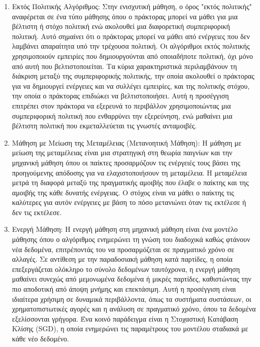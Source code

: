 \begin{enumerate}
    \item Εκτός Πολιτικής Αλγόριθμος: Στην ενισχυτική μάθηση, ο όρος "εκτός πολιτικής" αναφέρεται σε ένα τύπο μάθησης όπου ο πράκτορας μπορεί να μάθει για μια βέλτιστη ή στόχο πολιτική ενώ ακολουθεί μια διαφορετική συμπεριφορική πολιτική. Αυτό σημαίνει ότι ο πράκτορας μπορεί να μάθει από ενέργειες που δεν λαμβάνει απαραίτητα υπό την τρέχουσα πολιτική. Οι αλγόριθμοι εκτός πολιτικής χρησιμοποιούν εμπειρίες που δημιουργούνται από οποιαδήποτε πολιτική, όχι μόνο από αυτή που βελτιστοποιείται. Τα κύρια χαρακτηριστικά περιλαμβάνουν τη διάκριση μεταξύ της συμπεριφορικής πολιτικής, την οποία ακολουθεί ο πράκτορας για να δημιουργεί ενέργειες και να συλλέγει εμπειρίες, και της πολιτικής στόχου, την οποία ο πράκτορας επιδιώκει να βελτιστοποιήσει. Αυτή η προσέγγιση επιτρέπει στον πράκτορα να εξερευνά το περιβάλλον χρησιμοποιώντας μια συμπεριφορική πολιτική που ενθαρρύνει την εξερεύνηση, ενώ μαθαίνει μια βέλτιστη πολιτική που εκμεταλλεύεται τις γνωστές ανταμοιβές. 

    \item Μάθηση με Μείωση της Μεταμέλειας (Μετανοητική Μάθηση): Η μάθηση με μείωση της μεταμέλειας είναι μια στρατηγική στη θεωρία παιγνίων και την μηχανική μάθηση όπου οι παίκτες προσαρμόζουν τις ενέργειές τους βάσει της προηγούμενης απόδοσης για να ελαχιστοποιήσουν τη μεταμέλεια. Η μεταμέλεια μετρά τη διαφορά μεταξύ της πραγματικής αμοιβής που έλαβε ο παίκτης και της αμοιβής της κάθε δυνατής ενέργειας. Ο στόχος είναι να μάθει ο παίκτης τις καλύτερες για αυτόν ενέργειες με βάση το πόσο μετανιώνει όταν τις εκτέλεσε ή δεν τις εκτέλεσε. 

    \item Ενεργή Μάθηση: Η ενεργή μάθηση στη μηχανική μάθηση είναι ένα μοντέλο μάθησης όπου ο αλγόριθμος ενημερώνει τη γνώση του διαδοχικά καθώς φτάνουν νέα δεδομένα, επιτρέποντάς του να προσαρμόζεται σε πραγματικό χρόνο σε αλλαγές. Σε αντίθεση με την παραδοσιακή μάθηση κατά παρτίδες, η οποία επεξεργάζεται ολόκληρο το σύνολο δεδομένων ταυτόχρονα, η ενεργή μάθηση μαθαίνει συνεχώς από μεμονωμένα δεδομένα ή μικρές παρτίδες, καθιστώντας την πιο αποδοτική από άποψη μνήμης και επεκτάσιμη. Αυτή η προσέγγιση είναι ιδιαίτερα χρήσιμη σε δυναμικά περιβάλλοντα, όπως τα συστήματα συστάσεων, οι χρηματοπιστωτικές αγορές και η ανάλυση σε πραγματικό χρόνο, όπου τα δεδομένα εξελίσσονται γρήγορα. Ένα κοινό παράδειγμα είναι η Στοχαστική Κατάβαση Κλίσης (SGD), η οποία ενημερώνει τις παραμέτρους του μοντέλου σταδιακά με κάθε νέο δεδομένο. 


\end{enumerate}
